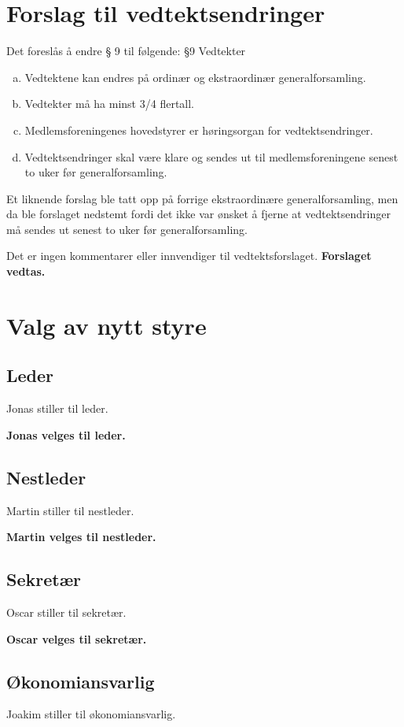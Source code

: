 \documentclass[a4paper,norsk]{article}
\begin{document}
\section{Forslag til vedtektsendringer}
Det foreslås å endre § 9 til følgende:
§9 Vedtekter
\begin{enumerate}[a)]
	\item Vedtektene kan endres på ordinær og ekstraordinær generalforsamling.
	\item Vedtekter må ha minst 3/4 flertall.
	\item Medlemsforeningenes hovedstyrer er høringsorgan for vedtektsendringer.
	\item Vedtektsendringer skal være klare og sendes ut til medlemsforeningene senest to uker før generalforsamling.
\end{enumerate}

Et liknende forslag ble tatt opp på forrige ekstraordinære generalforsamling, men da ble forslaget nedstemt fordi det ikke var ønsket å fjerne at vedtektsendringer må sendes ut senest to uker før generalforsamling. 

Det er ingen kommentarer eller innvendiger til vedtektsforslaget. \textbf{Forslaget vedtas.}


\section{Valg av nytt styre}

\subsection{Leder}
Jonas stiller til leder.

\textbf{Jonas velges til leder.}

\subsection{Nestleder}
Martin stiller til nestleder.

\textbf{Martin velges til nestleder.}


\subsection{Sekretær}
Oscar stiller til sekretær. 

\textbf{Oscar velges til sekretær.}


\subsection{Økonomiansvarlig}
Joakim stiller til økonomiansvarlig. 
\end{document}
